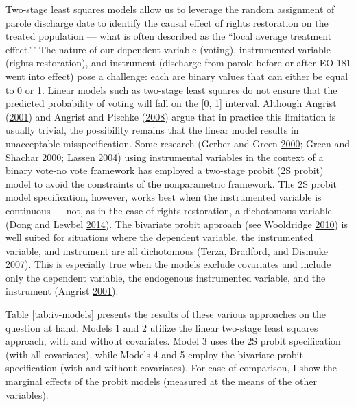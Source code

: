 \documentclass[
  12pt,
]{article}
\begin{document}
Two-stage least squares models allow us to leverage the random assignment of parole discharge date to identify the causal effect of rights restoration on the treated population --- what is often described as the ``local average treatment effect.'\,' The nature of our dependent variable (voting), instrumented variable (rights restoration), and instrument (discharge from parole before or after EO 181 went into effect) pose a challenge: each are binary values that can either be equal to 0 or 1. Linear models such as two-stage least squares do not ensure that the predicted probability of voting will fall on the {[}0, 1{]} interval. Although Angrist (\protect\hyperlink{ref-Angrist2001}{2001}) and Angrist and Pischke (\protect\hyperlink{ref-Angrist2008}{2008}) argue that in practice this limitation is usually trivial, the possibility remains that the linear model results in unacceptable misspecification. Some research (Gerber and Green \protect\hyperlink{ref-Gerber2000}{2000}; Green and Shachar \protect\hyperlink{ref-Green2000}{2000}; Lassen \protect\hyperlink{ref-Lassen2004}{2004}) using instrumental variables in the context of a binary vote-no vote framework has employed a two-stage probit (2S probit) model to avoid the constraints of the nonparametric framework. The 2S probit model specification, however, works best when the instrumented variable is continuous --- not, as in the case of rights restoration, a dichotomous variable (Dong and Lewbel \protect\hyperlink{ref-Dong2014}{2014}). The bivariate probit approach (see Wooldridge \protect\hyperlink{ref-Wooldridge2010}{2010}) is well suited for situations where the dependent variable, the instrumented variable, and instrument are all dichotomous (Terza, Bradford, and Dismuke \protect\hyperlink{ref-Terza2007}{2007}). This is especially true when the models exclude covariates and include only the dependent variable, the endogenous instrumented variable, and the instrument (Angrist \protect\hyperlink{ref-Angrist2001}{2001}).

Table \ref{tab:iv-models} presents the results of these various approaches on the question at hand. Models 1 and 2 utilize the linear two-stage least squares approach, with and without covariates. Model 3 uses the 2S probit specification (with all covariates), while Models 4 and 5 employ the bivariate probit specification (with and without covariates). For ease of comparison, I show the marginal effects of the probit models (measured at the means of the other variables).


\end{document}
